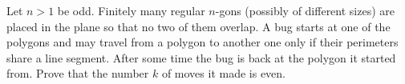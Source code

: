 Let $n>1$ be odd. Finitely many regular $n$-gons (possibly of different sizes) are placed in the plane so that no two of them overlap. A bug starts at one of the polygons and may travel from a polygon to another one only if their perimeters share a line segment. After some time the bug is back at the polygon it started from. Prove that the number $k$ of moves it made is even.
